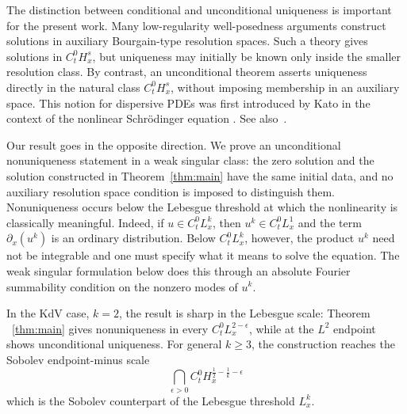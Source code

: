 \documentclass[12pt,reqno,letterpaper]{amsart}
\numberwithin{equation}{section}
\newcommand{\1}{{\bf 1}}
\newcommand{\2}{{\bf 2}}
\theoremstyle{remark}
\theoremstyle{remark}
\begin{document}
The distinction between conditional and unconditional uniqueness is important for the present work. Many low-regularity well-posedness arguments construct solutions in auxiliary Bourgain-type resolution spaces. Such a theory gives solutions in $C_t^0H_x^s$, but uniqueness may initially be known only inside the smaller resolution class. By contrast, an unconditional theorem asserts uniqueness directly in the natural class $C_t^0H_x^s$, without imposing membership in an auxiliary space. This notion for dispersive PDEs was first introduced by Kato in the context of the nonlinear Schr\"{o}dinger equation \cite{Kato1995}. See also~\cite{BIT,MT,MolinetPilodVento}. 

Our result goes in the opposite direction. We prove an unconditional nonuniqueness statement in a weak singular class: the zero solution and the solution constructed in Theorem~\ref{thm:main} have the same initial data, and no auxiliary resolution space condition is imposed to distinguish them. Nonuniqueness occurs below the Lebesgue threshold at which the nonlinearity is classically meaningful. Indeed, if $u\in C_t^0L_x^k$, then $u^k \in C_t^0L_x^1$ and the term $\partial_x(u^k)$ is an ordinary distribution. Below $C_t^0L_x^k$, however, the product $u^k$ need not be integrable and one must specify what it means to solve the equation. The weak singular formulation below does this through an absolute Fourier summability condition on the nonzero modes of $u^k$.

In the \textsf{KdV} case, $k=2$, the result is sharp in the Lebesgue scale: Theorem ~\ref{thm:main} gives nonuniqueness in every $C_t^0L_x^{2-\epsilon}$, while at the $L^2$ endpoint ~\cite{BIT} shows unconditional uniqueness. For general $k\ge3$, the construction reaches the Sobolev endpoint-minus scale
\[
\bigcap_{\epsilon>0} C_t^0H_x^{\frac12-\frac1k-\epsilon}
\]
which is the Sobolev counterpart of the Lebesgue threshold $L^k_x$.
\end{document}
